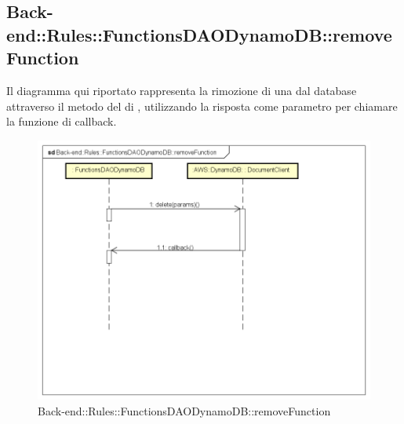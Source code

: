\subsection{Back-end::Rules::FunctionsDAODynamoDB::removeFunction}
Il diagramma qui riportato rappresenta la rimozione di una  dal database attraverso il metodo  del  di , utilizzando la risposta come parametro per chiamare la funzione di callback.
\begin{figure}[h] \centering \includegraphics[width=\textwidth,height=\textheight,keepaspectratio]{images/diagrams/back-end/Ufficial_Backend/Back-endRulesFunctionsDAODynamoDBremoveFunction.png} 	\caption{Back-end::Rules::FunctionsDAODynamoDB::removeFunction}
\end{figure}
\newpage

